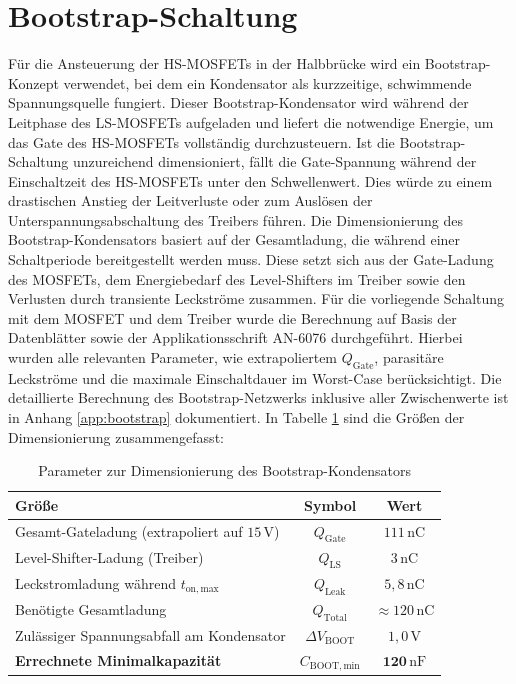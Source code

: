 \section{Bootstrap-Schaltung}
\label{sec:bootstrap}

Für die Ansteuerung der HS-MOSFETs in der Halbbrücke wird ein Bootstrap-Konzept verwendet, bei dem ein Kondensator als kurzzeitige, schwimmende Spannungsquelle fungiert. Dieser Bootstrap-Kondensator wird während der Leitphase des LS-MOSFETs aufgeladen und liefert die notwendige Energie, um das Gate des HS-MOSFETs vollständig durchzusteuern. 
Ist die Bootstrap-Schaltung unzureichend dimensioniert, fällt die Gate-Spannung während der Einschaltzeit des HS-MOSFETs unter den Schwellenwert. Dies würde zu einem drastischen Anstieg der Leitverluste oder zum Auslösen der Unterspannungsabschaltung des Treibers führen.
Die Dimensionierung des Bootstrap-Kondensators basiert auf der Gesamtladung, die während einer Schaltperiode bereitgestellt werden muss. Diese setzt sich aus der Gate-Ladung des MOSFETs, dem Energiebedarf des Level-Shifters im Treiber sowie den Verlusten durch transiente Leckströme zusammen. 
Für die vorliegende Schaltung mit dem MOSFET und dem Treiber wurde die Berechnung auf Basis der Datenblätter sowie der Applikationsschrift AN-6076 \cite{AN6076} durchgeführt. 
Hierbei wurden alle relevanten Parameter, wie extrapoliertem $Q_{\mathrm{Gate}}$, parasitäre Leckströme und die maximale Einschaltdauer im Worst-Case berücksichtigt. Die detaillierte Berechnung des Bootstrap-Netzwerks inklusive aller Zwischenwerte ist in Anhang \ref{app:bootstrap} dokumentiert.
In Tabelle \ref{tab:bootstrap_params} sind die Größen der Dimensionierung zusammengefasst:

\begin{table}[!htbp] 
    \centering
    \caption{Parameter zur Dimensionierung des Bootstrap-Kondensators}
    \label{tab:bootstrap_params}
    \begin{tabular}{lcc}
        \toprule
        \textbf{Größe} & \textbf{Symbol} & \textbf{Wert} \\
        \midrule
        Gesamt-Gateladung (extrapoliert auf $15\,\mathrm{V}$) & $Q_{\mathrm{Gate}}$ & $111\,\mathrm{nC}$ \\
        Level-Shifter-Ladung (Treiber) & $Q_{\mathrm{LS}}$ & $3\,\mathrm{nC}$ \\
        Leckstromladung während $t_{\mathrm{on,max}}$ & $Q_{\mathrm{Leak}}$ & $5{,}8\,\mathrm{nC}$ \\
        \midrule
        Benötigte Gesamtladung & $Q_{\mathrm{Total}}$ & $\approx 120\,\mathrm{nC}$ \\
        Zulässiger Spannungsabfall am Kondensator & $\Delta V_{\mathrm{BOOT}}$ & $1{,}0\,\mathrm{V}$ \\
        \midrule
        \textbf{Errechnete Minimalkapazität} & $C_{\mathrm{BOOT,min}}$ & $\mathbf{120\,\mathrm{nF}}$ \\
        \bottomrule
    \end{tabular}
\end{table}

